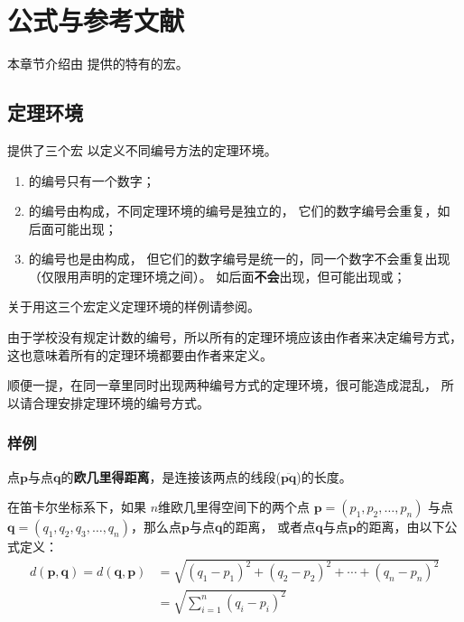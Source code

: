 \chapter{公式与参考文献}

本章节介绍由 \nwafuthesis{} 提供的特有的宏。

\section{定理环境}

\nwafuthesis{} 提供了三个宏  以定义不同编号方法的定理环境。
\begin{enumerate}
  \item {} 的编号只有一个数字；
  \item {} 的编号由构成，不同定理环境的编号是独立的，
  它们的数字编号会重复，如后面可能出现；
  \item {} 的编号也是由构成，
  但它们的数字编号是统一的，同一个数字不会重复出现（仅限用声明的定理环境之间）。
  如后面\textbf{不会}出现，但可能出现或；
\end{enumerate}

关于用这三个宏定义定理环境的样例请参阅。

由于学校没有规定计数的编号，所以所有的定理环境应该由作者来决定编号方式，
这也意味着所有的定理环境都要由作者来定义。

顺便一提，在同一章里同时出现两种编号方式的定理环境，很可能造成混乱，
所以请合理安排定理环境的编号方式。

\subsection*{样例}

\begin{definition}[欧几里得距离]
\label{def:distance}
点$\mathbf{p}$与点$\mathbf{q}$的\textbf{欧几里得距离}，是连接该两点的线段($\overline{\mathbf{pq}}$)的长度。

在笛卡尔坐标系下，如果 $n$维欧几里得空间下的两个点 $\mathbf{p}=(p_1, p_2, \dots, p_n)$ 与点
$\mathbf{q} = (q_1, q_2, q_3, \dots, q_n)$，那么点$\mathbf{p}$与点$\mathbf{q}$的距离，
或者点$\mathbf{q}$与点$\mathbf{p}$的距离，由以下公式定义：
\begin{align}
\label{equ:1}
d(\mathbf{p},\mathbf{q}) = d(\mathbf{q},\mathbf{p}) & = \sqrt{(q_1-p_1)^2 + (q_2-p_2)^2 + \cdots + (q_n-p_n)^2} \\
\label{equ:2}
& = \sqrt{\sum_{i=1}^n (q_i-p_i)^2}
\end{align}
\end{definition}

